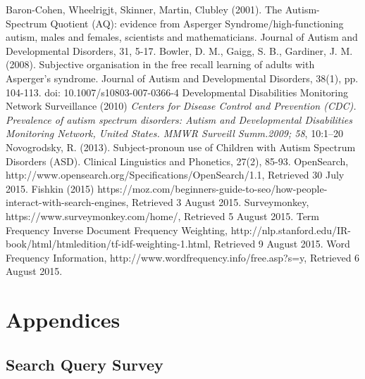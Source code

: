 \documentclass[a4paper, 11pt]{article}
\begin{document}
\clearpage
\begin{thebibliography}{100}
 Baron-Cohen, Wheelrigjt, Skinner, Martin, Clubley (2001).   The Autism-Spectrum Quotient (AQ): evidence from Asperger Syndrome/high-functioning autism, males and females, scientists and mathematicians.  Journal of Autism and Developmental Disorders, 31, 5-17.
 Bowler, D. M., Gaigg, S. B., Gardiner, J. M. (2008). Subjective organisation in the free recall learning of adults with Asperger's syndrome. Journal of Autism and Developmental Disorders, 38(1), pp. 104-113. doi: 10.1007/s10803-007-0366-4 
Developmental Disabilities Monitoring Network Surveillance (2010) \textit{Centers for Disease Control and Prevention (CDC). Prevalence of autism spectrum disorders: Autism and Developmental Disabilities Monitoring Network, United States. MMWR Surveill Summ.2009; 58}, 10:1–20
 Novogrodsky, R. (2013). Subject-pronoun use of Children with Autism Spectrum Disorders (ASD). Clinical Linguistics and Phonetics, 27(2), 85-93. 
OpenSearch, http://www.opensearch.org/Specifications/OpenSearch/1.1, Retrieved 30 July 2015.
 Fishkin (2015) https://moz.com/beginners-guide-to-seo/how-people-interact-with-search-engines, Retrieved 3 August 2015.
Surveymonkey, https://www.surveymonkey.com/home/, Retrieved 5 August 2015.
 Term Frequency Inverse Document Frequency Weighting, http://nlp.stanford.edu/IR-book/html/htmledition/tf-idf-weighting-1.html, Retrieved 9 August 2015.
 Word Frequency Information, http://www.wordfrequency.info/free.asp?s=y, Retrieved 6 August 2015.
\end{thebibliography}

\newpage
\section {Appendices}

\newpage
\subsection{Search Query Survey} \label{AppendixA}
\end{document}
